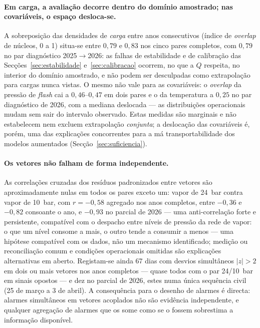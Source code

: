 \paragraph{Em carga, a avaliação decorre dentro do domínio amostrado; nas
covariáveis, o espaço desloca-se.} A sobreposição das densidades de
\emph{carga} entre anos consecutivos (índice de \emph{overlap} de núcleos, 0
a 1) situa-se entre $0{,}79$ e $0{,}83$ nos cinco pares completos, com
$0{,}79$ no par diagnóstico 2025${\to}$2026: as falhas de estabilidade e de
calibração das Secções~\ref{sec:estabilidade} e~\ref{sec:calibracao}
ocorrem, no que a $Q$ respeita, no interior do domínio amostrado, e não podem
ser desculpadas como extrapolação para cargas nunca vistas. O mesmo não vale
para as covariáveis: o \emph{overlap} da pressão de \emph{flash} cai a
$0{,}46$--$0{,}47$ em dois pares e o da temperatura a $0{,}25$ no par
diagnóstico de 2026, com a mediana deslocada --- as distribuições
operacionais mudam sem sair do intervalo observado. Estas medidas são
marginais e não estabelecem nem excluem extrapolação \emph{conjunta}; a
deslocação das covariáveis é, porém, uma das explicações concorrentes para a
má transportabilidade dos modelos aumentados
(Secção~\ref{sec:suficiencia}).

\paragraph{Os vetores não falham de forma independente.} As correlações
cruzadas dos resíduos padronizados entre vetores são aproximadamente nulas
em todos os pares exceto um: vapor de 24~bar contra vapor de 10~bar, com
$r = -0{,}58$ agregado nos anos completos, entre $-0{,}36$ e $-0{,}82$
consoante o ano, e $-0{,}93$ no parcial de 2026 --- uma anti-correlação forte
e persistente, compatível com o despacho entre níveis de pressão da rede de
vapor: o que um nível consome a mais, o outro tende a consumir a menos ---
uma hipótese compatível com os dados, não um mecanismo identificado; medição
ou reconciliação comum e condições operacionais omitidas são explicações
alternativas em aberto. Registam-se ainda 67 dias com desvios simultâneos
$|z| > 2$ em dois ou mais vetores nos anos completos --- quase todos com o
par 24/10~bar em sinais opostos --- e dez no parcial de 2026, estes numa
única sequência civil (25 de março a 3 de abril). A consequência para o
desenho de alarmes é directa: alarmes
simultâneos em vetores acoplados não são evidência independente, e qualquer
agregação de alarmes que os some como se o fossem sobrestima a informação
disponível.

